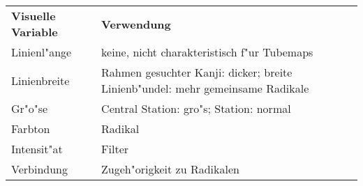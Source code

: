\begin{table}[h]
\begin{tabular}{ll}

\textbf{Visuelle Variable} & \textbf{Verwendung}                                                          \\
Linienl"ange       & keine, nicht charakteristisch f"ur Tubemaps                                    \\
Linienbreite      & Rahmen gesuchter Kanji: dicker; breite Linienb"undel: mehr gemeinsame Radikale \\
Gr"o"se             & Central Station: gro"s; Station: normal                                       \\
Farbton           & Radikal                                                                        \\
Intensit"at       & Filter                                                                          \\
Verbindung    & Zugeh"origkeit zu Radikalen                                                                       \\
\end{tabular}
\end{table}
